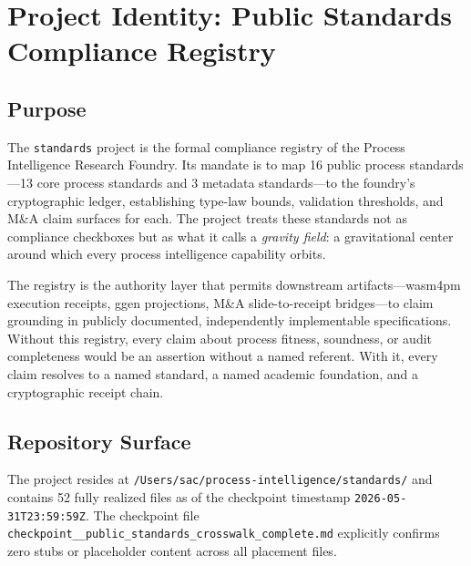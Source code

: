 
\section{Project Identity: Public Standards Compliance Registry}
\label{sec:standards-identity}

\subsection{Purpose}
\label{sec:standards-identity-purpose}

The \texttt{standards} project is the formal compliance registry of the Process Intelligence
Research Foundry. Its mandate is to map 16 public process standards---13 core process
standards and 3 metadata standards---to the foundry's cryptographic ledger, establishing
type-law bounds, validation thresholds, and M\&A claim surfaces for each. The project
treats these standards not as compliance checkboxes but as what it calls a \emph{gravity
field}: a gravitational center around which every process intelligence capability orbits.

The registry is the authority layer that permits downstream artifacts---wasm4pm execution
receipts, ggen projections, M\&A slide-to-receipt bridges---to claim grounding in publicly
documented, independently implementable specifications. Without this registry, every claim
about process fitness, soundness, or audit completeness would be an assertion without a
named referent. With it, every claim resolves to a named standard, a named academic
foundation, and a cryptographic receipt chain.

\subsection{Repository Surface}
\label{sec:standards-identity-surface}

The project resides at \texttt{/Users/sac/process-intelligence/standards/} and contains
52 fully realized files as of the checkpoint timestamp \texttt{2026-05-31T23:59:59Z}. The
checkpoint file \texttt{checkpoint\_\_public\_standards\_crosswalk\_complete.md} explicitly
confirms zero stubs or placeholder content across all placement files.

